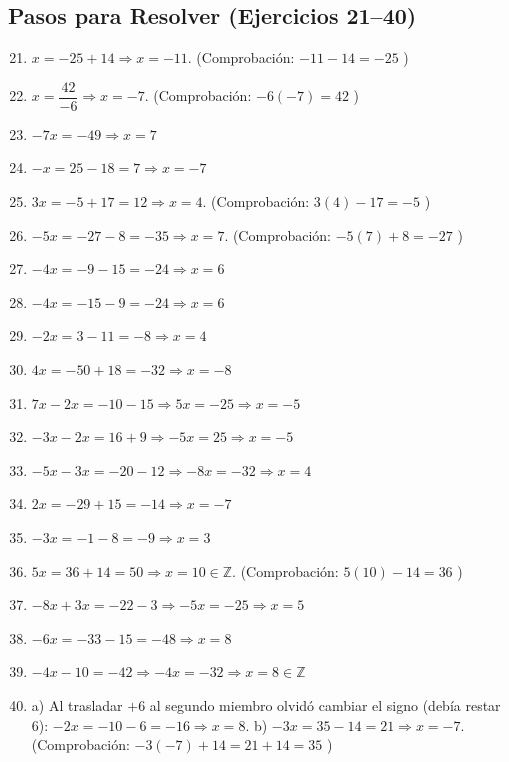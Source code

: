 \documentclass[12pt, letterpaper]{article}
\newcommand{\Z}{\mathbb{Z}}
\begin{document}
  \subsection*{Pasos para Resolver (Ejercicios 21--40)}

  \begin{enumerate}[leftmargin=*, label=\textbf{\arabic*.}]
    \setcounter{enumi}{20}
    \item $x = -25 + 14 \Rightarrow x = -11$. \quad (Comprobación: $-11 - 14 = -25$ \checkmark)
    \item $x = \dfrac{42}{-6} \Rightarrow x = -7$. \quad (Comprobación: $-6(-7) = 42$ \checkmark)
    \item $-7x = -49 \Rightarrow x = 7$
    \item $-x = 25 - 18 = 7 \Rightarrow x = -7$
    \item $3x = -5 + 17 = 12 \Rightarrow x = 4$. \quad (Comprobación: $3(4) - 17 = -5$ \checkmark)
    \item $-5x = -27 - 8 = -35 \Rightarrow x = 7$. \quad (Comprobación: $-5(7) + 8 = -27$ \checkmark)
    \item $-4x = -9 - 15 = -24 \Rightarrow x = 6$
    \item $-4x = -15 - 9 = -24 \Rightarrow x = 6$
    \item $-2x = 3 - 11 = -8 \Rightarrow x = 4$
    \item $4x = -50 + 18 = -32 \Rightarrow x = -8$
    \item $7x - 2x = -10 - 15 \Rightarrow 5x = -25 \Rightarrow x = -5$
    \item $-3x - 2x = 16 + 9 \Rightarrow -5x = 25 \Rightarrow x = -5$
    \item $-5x - 3x = -20 - 12 \Rightarrow -8x = -32 \Rightarrow x = 4$
    \item $2x = -29 + 15 = -14 \Rightarrow x = -7$
    \item $-3x = -1 - 8 = -9 \Rightarrow x = 3$
    \item $5x = 36 + 14 = 50 \Rightarrow x = 10 \in \Z$. \quad (Comprobación: $5(10) - 14 = 36$ \checkmark)
    \item $-8x + 3x = -22 - 3 \Rightarrow -5x = -25 \Rightarrow x = 5$
    \item $-6x = -33 - 15 = -48 \Rightarrow x = 8$
    \item $-4x - 10 = -42 \Rightarrow -4x = -32 \Rightarrow x = 8 \in \Z$ \checkmark
    \item a) Al trasladar $+6$ al segundo miembro olvidó cambiar el signo (debía restar $6$): $-2x = -10 - 6 = -16 \Rightarrow x = 8$. \quad b) $-3x = 35 - 14 = 21 \Rightarrow x = -7$. (Comprobación: $-3(-7) + 14 = 21 + 14 = 35$ \checkmark)
  \end{enumerate}
\end{document}
